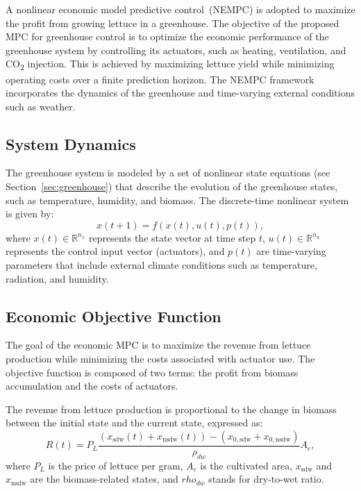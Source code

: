 \documentclass[conference]{IEEEtran}
\begin{document}
A nonlinear economic model predictive control~(NEMPC) is adopted to maximize the profit from growing lettuce in a greenhouse. The objective of the proposed MPC for greenhouse control is to optimize the economic performance of the greenhouse system by controlling its actuators, such as heating, ventilation, and CO\textsubscript{2} injection. This is achieved by maximizing lettuce yield while minimizing operating costs over a finite prediction horizon. The NEMPC framework incorporates the dynamics of the greenhouse and time-varying external conditions such as weather.

\subsection{System Dynamics}\label{subsec:mpc_dynamics}

The greenhouse system is modeled by a set of nonlinear state equations (see Section~\ref{sec:greenhouse}) that describe the evolution of the greenhouse states, such as temperature, humidity, and biomass. The discrete-time nonlinear system is given by:
\begin{equation}
    x(t+1) = f\left( x(t), u(t), p(t) \right),
\end{equation}
where \(x(t) \in \mathbb{R}^{n_x}\) represents the state vector at time step \(t\), \(u(t) \in \mathbb{R}^{n_u}\) represents the control input vector (actuators), and \(p(t)\) are time-varying parameters that include external climate conditions such as temperature, radiation, and humidity.

\subsection{Economic Objective Function}\label{subsec:mpc_objective}

The goal of the economic MPC is to maximize the revenue from lettuce production while minimizing the costs associated with actuator use. The objective function is composed of two terms: the profit from biomass accumulation and the costs of actuators.

The revenue from lettuce production is proportional to the change in biomass between the initial state and the current state, expressed as:
\begin{equation}
    R(t) = P_L  \frac{(x_{\mathrm{sdw}}(t) + x_{\mathrm{nsdw}}(t)) - (x_{0, \mathrm{sdw}} + x_{0, \mathrm{nsdw} })}{\rho_{dw}}  A_c,
\end{equation}
where \(P_L\) is the price of lettuce per gram, \(A_c\) is the cultivated area, \(x_{\mathrm{sdw}}\) and \(x_{\mathrm{nsdw}}\) are the biomass-related states, and \(rho_{dw}\) stands for dry-to-wet ratio.
\end{document}
